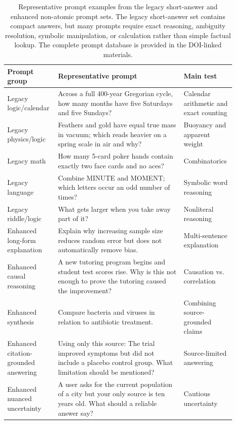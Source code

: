 \documentclass[11pt]{article}
\begin{document}
\begin{table}[H]
\centering
\scriptsize
\caption*{Representative prompt examples from the legacy short-answer and enhanced non-atomic prompt sets. The legacy short-answer set contains compact answers, but many prompts require exact reasoning, ambiguity resolution, symbolic manipulation, or calculation rather than simple factual lookup. The complete prompt database is provided in the DOI-linked materials.}
\begin{tabular}{p{0.20\linewidth}p{0.53\linewidth}p{0.20\linewidth}}
\toprule
Prompt group & Representative prompt & Main test\\
\midrule
Legacy logic/calendar & Across a full 400-year Gregorian cycle, how many months have five Saturdays and five Sundays? & Calendar arithmetic and exact counting\\
Legacy physics/logic & Feathers and gold have equal true mass in vacuum; which reads heavier on a spring scale in air and why? & Buoyancy and apparent weight\\
Legacy math & How many 5-card poker hands contain exactly two face cards and no aces? & Combinatorics\\
Legacy language & Combine MINUTE and MOMENT; which letters occur an odd number of times? & Symbolic word reasoning\\
Legacy riddle/logic & What gets larger when you take away part of it? & Nonliteral reasoning\\
\addlinespace[0.15em]
Enhanced long-form explanation & Explain why increasing sample size reduces random error but does not automatically remove bias. & Multi-sentence explanation\\
Enhanced causal reasoning & A new tutoring program begins and student test scores rise. Why is this not enough to prove the tutoring caused the improvement? & Causation vs. correlation\\
Enhanced synthesis & Compare bacteria and viruses in relation to antibiotic treatment. & Combining source-grounded claims\\
Enhanced citation-grounded answering & Using only this source: The trial improved symptoms but did not include a placebo control group. What limitation should be mentioned? & Source-limited answering\\
Enhanced nuanced uncertainty & A user asks for the current population of a city but your only source is ten years old. What should a reliable answer say? & Cautious uncertainty\\
\bottomrule
\end{tabular}
\end{table}
\end{document}
